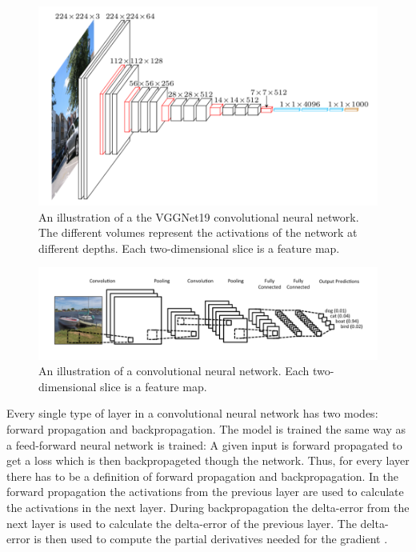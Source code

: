 \documentclass[a4paper, twoside]{article}
\begin{document}
\begin{figure}[h]
	\centering
  		\includegraphics[scale=0.6]{vggnet.png}
  	\caption{An illustration \cite{vgg} of a the VGGNet19 convolutional neural network. The different volumes represent the activations of the network at different depths. Each two-dimensional slice is a feature map.} \label{figvgg}
\end{figure}

\begin{figure}[h]
	\centering
  		\includegraphics[scale=0.6]{boatcnn.png}
  	\caption{An illustration \cite{figkonv} of a convolutional neural network. Each two-dimensional slice is a feature map.}\label{figboatcnn}
\end{figure}

Every single type of layer in a convolutional neural network has two modes: forward propagation and backpropagation. The model is trained the same way as a feed-forward neural network is trained: A given input is forward propagated to get a loss which is then backpropageted though the network. Thus, for every layer there has to be a definition of forward propagation and backpropagation. In the forward propagation the activations from the previous layer are used to calculate the activations in the next layer. During backpropagation the delta-error from the next layer is used to calculate the delta-error of the previous layer. The delta-error is then used to compute the partial derivatives needed for the gradient \cite{cs231n} \cite{convmath}. 
\end{document}
